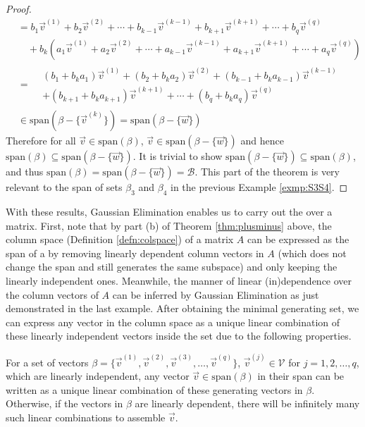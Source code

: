 \begin{proof}
\begin{align*}
&= b_1\vec{v}^{(1)} + b_2\vec{v}^{(2)} + \cdots + b_{k-1}\vec{v}^{(k-1)} + b_{k+1}\vec{v}^{(k+1)} + \cdots + b_q\vec{v}^{(q)} \\
&\quad + b_k(a_1\vec{v}^{(1)} + a_2\vec{v}^{(2)} + \cdots + a_{k-1}\vec{v}^{(k-1)} + a_{k+1}\vec{v}^{(k+1)} + \cdots + a_q\vec{v}^{(q)}) \\    
&=
\begin{aligned}
&(b_1 + b_ka_1) \vec{v}^{(1)} + (b_2 + b_ka_2) \vec{v}^{(2)} + (b_{k-1} + b_ka_{k-1})\vec{v}^{(k-1)} \\
& + (b_{k+1} + b_ka_{k+1}) \vec{v}^{(k+1)} + \cdots + (b_q + b_ka_q)\vec{v}^{(q)}
\end{aligned} \\
&\in \text{span}(\mathcal{\beta} - \{\vec{v}^{(k)}\}) = \text{span}(\mathcal{\beta} - \{\vec{w}\})
\end{align*}
Therefore for all $\vec{v} \in \text{span}(\mathcal{\beta})$, $\vec{v} \in \text{span}(\mathcal{\beta} - \{\vec{w}\})$ and hence $\text{span}(\mathcal{\beta}) \subseteq \text{span}(\mathcal{\beta} - \{\vec{w}\})$. It is trivial to show $\text{span}(\mathcal{\beta} - \{\vec{w}\}) \subseteq \text{span}(\mathcal{\beta})$, and thus $\text{span}(\mathcal{\beta}) = \text{span}(\mathcal{\beta} - \{\vec{w}\}) = \mathcal{B}$. This part of the theorem is very relevant to the span of sets $\mathcal{\beta}_3$ and $\mathcal{\beta}_4$ in the previous Example \ref{exmp:S3S4}.
\end{proof}
With these results, Gaussian Elimination enables us to carry out the  over a matrix. First, note that by part (b) of Theorem \ref{thm:plusminus} above, the column space (Definition \ref{defn:colspace}) of a matrix $A$ can be expressed as the span of a  by removing linearly dependent column vectors in $A$ (which does not change the span and still generates the same subspace) and only keeping the linearly independent ones. Meanwhile, the manner of linear (in)dependence over the column vectors of $A$ can be inferred by Gaussian Elimination as just demonstrated in the last example. After obtaining the minimal generating set, we can express any vector in the column space as a unique linear combination of these linearly independent vectors inside the set due to the following properties.
\begin{proper}
\label{proper:lincombofspan}
For a set of vectors $\mathcal{\beta} = \{\vec{v}^{(1)}, \vec{v}^{(2)}, \vec{v}^{(3)}, \ldots, \vec{v}^{(q)}\}$, $\vec{v}^{(j)} \in \mathcal{V}$ for $j = 1,2,\ldots,q$, which are linearly independent, any vector $\vec{v} \in \text{span}(\mathcal{\beta})$ in their span can be written as a unique linear combination of these generating vectors in $\mathcal{\beta}$. Otherwise, if the vectors in $\mathcal{\beta}$ are linearly dependent, there will be infinitely many such linear combinations to assemble $\vec{v}$.
\end{proper}
